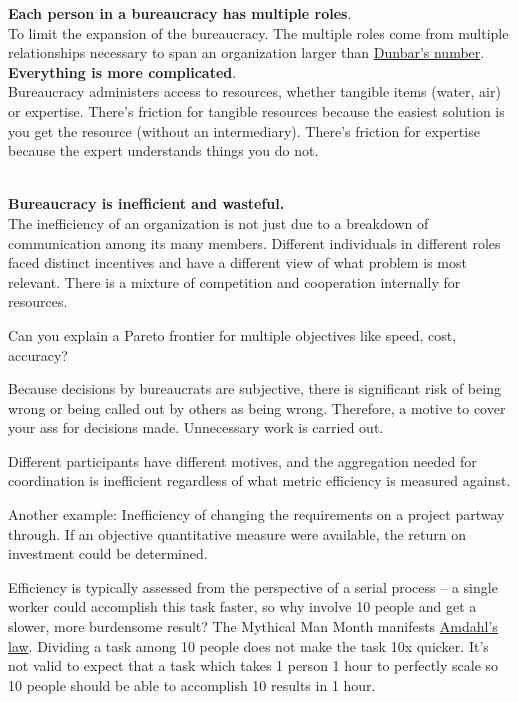 \textbf{Each person in a bureaucracy has multiple roles}.\\
To limit the expansion of the bureaucracy. The multiple roles come from multiple relationships necessary to span an organization larger than \href{https://en.wikipedia.org/wiki/Dunbar\%27s_number}{Dunbar's number}. 
\ \\

\textbf{Everything is more complicated}. \\
Bureaucracy administers access to resources, whether tangible items (water, air) or expertise. There's friction for tangible resources because the easiest solution is you get the resource (without an intermediary). There's friction for expertise because the expert understands things you do not. 

\ \\

\textbf{Bureaucracy is inefficient and wasteful.}\\
The inefficiency of an organization is not just due to a breakdown of communication among its many members. Different individuals in different roles faced distinct incentives and have a different view of what problem is most relevant. There is a mixture of competition and cooperation internally for resources.


Can you explain a Pareto frontier for multiple objectives like speed, cost, accuracy?

Because decisions by bureaucrats are subjective, there is significant risk of being wrong or being called out by others as being wrong. Therefore, a motive to cover your ass for decisions made. Unnecessary work is carried out. 

Different participants have different motives, and the aggregation needed for coordination is inefficient regardless of what metric efficiency is measured against.

Another example: Inefficiency of changing the requirements on a project partway through. If an objective quantitative measure were available, the return on investment could be determined. 

Efficiency is typically assessed from the perspective of a serial process -- a single worker could accomplish this task faster, so why involve 10 people and get a slower, more burdensome result? The Mythical Man Month manifests \href{https://en.wikipedia.org/wiki/Amdahl\%27s_law}{Amdahl's law}. Dividing a task among 10 people does not make the task 10x quicker. It's not valid to expect that a task which takes 1 person 1 hour to perfectly scale so 10 people should be able to accomplish 10 results in 1 hour.

